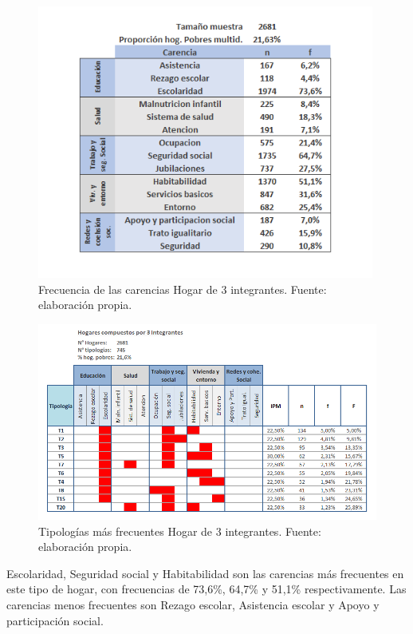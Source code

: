 \documentclass[12pt,letterpaper,spanish]{article}
\begin{document}
\begin{itemize}
    \begin{figure}[H]
        \centering
        \includegraphics[height=9cm]{HOGARES/tabla_num3.png}
        \caption{Frecuencia de las carencias Hogar de 3 integrantes. Fuente: elaboración propia.}
        \label{fren3}
    \end{figure}

    \begin{figure}[H]
        \centering
        \includegraphics[width=\textwidth]{Mati N/n=3.png}
        \caption{Tipologías más frecuentes Hogar de 3 integrantes. Fuente: elaboración propia.}
        \label{tipn3}
    \end{figure}
    
    Escolaridad, Seguridad social y Habitabilidad son las carencias más frecuentes en este tipo de hogar, con frecuencias de 73,6\%, 64,7\% y 51,1\% respectivamente. Las carencias menos frecuentes son Rezago escolar, Asistencia escolar y Apoyo y participación social.
    

\end{itemize}
\end{document}
